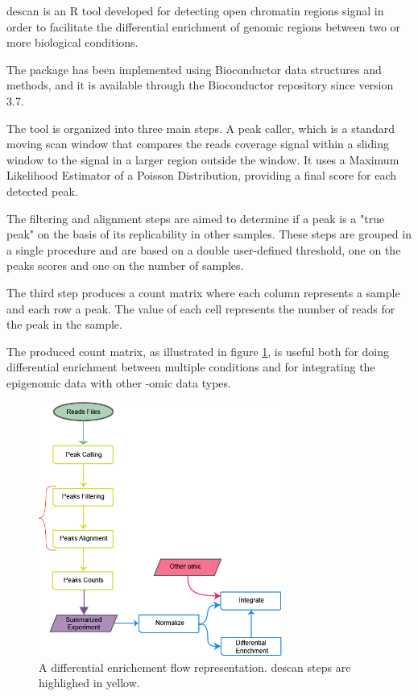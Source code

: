 \gls{descan} is an R \cite{Ihaka1996} tool developed for detecting open chromatin regions signal in order to facilitate the differential enrichment of genomic regions between two or more biological conditions.

The package has been implemented using Bioconductor \cite{Gentleman2004} data structures and methods, and it is available through the Bioconductor repository since version 3.7.

The tool is organized into three main steps. 
A peak caller, which is a standard moving scan window that compares the reads coverage signal within a sliding window to the signal in a larger region outside the window. It uses a Maximum Likelihood Estimator of a Poisson Distribution, providing a final score for each detected peak.

The filtering and alignment steps are aimed to determine if a peak is a "true peak" on the basis of its replicability in other samples. 
These steps are grouped in a single procedure and are based on a double user-defined threshold, one on the peaks scores and one on the number of samples.

The third step produces a count matrix where each column represents a sample and each row a peak. The value of each cell represents the number of reads for the peak in the sample.

The produced count matrix, as illustrated in figure \ref{fig:descan2flow}, is useful both for doing differential enrichment between multiple conditions and for integrating the epigenomic data with other -omic data types.


\begin{figure}[H]
\centering
\includegraphics[width=8cm, keepaspectratio]{img/descan2/flow.png}
\caption[DEScan2 workflow]{A differential enrichement flow representation. \gls{descan} steps are highlighed in yellow.}
\label{fig:descan2flow}
\end{figure}

